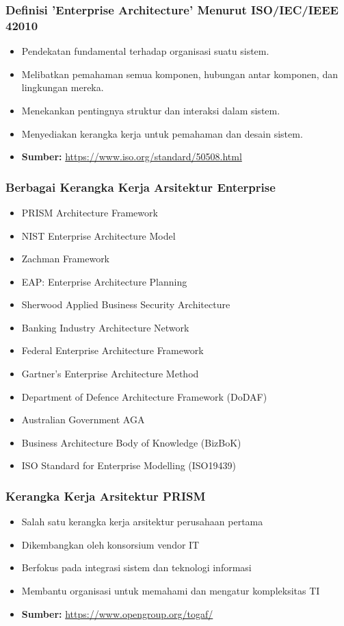 \documentclass{beamer}
\begin{document}
	\begin{frame}
		\frametitle{Definisi 'Enterprise Architecture' Menurut ISO/IEC/IEEE 42010}
		\begin{itemize}
			\item Pendekatan fundamental terhadap organisasi suatu sistem.
			\item Melibatkan pemahaman semua komponen, hubungan antar komponen, dan lingkungan mereka.
			\item Menekankan pentingnya struktur dan interaksi dalam sistem.
			\item Menyediakan kerangka kerja untuk pemahaman dan desain sistem.
			\item \textbf{Sumber:} \url{https://www.iso.org/standard/50508.html}
		\end{itemize}
	\end{frame}
	
	
	\begin{frame}
		\frametitle{Berbagai Kerangka Kerja Arsitektur Enterprise}
		\begin{itemize}
			\item PRISM Architecture Framework
			\item NIST Enterprise Architecture Model
			\item Zachman Framework
			\item EAP: Enterprise Architecture Planning
			\item Sherwood Applied Business Security Architecture
			\item Banking Industry Architecture Network
			\item Federal Enterprise Architecture Framework
			\item Gartner’s Enterprise Architecture Method
			\item Department of Defence Architecture Framework (DoDAF)
			\item Australian Government AGA
			\item Business Architecture Body of Knowledge (BizBoK)
			\item ISO Standard for Enterprise Modelling (ISO19439)
		\end{itemize}
	\end{frame}
	
	\begin{frame}
		\frametitle{Kerangka Kerja Arsitektur PRISM}
		\begin{itemize}
			\item Salah satu kerangka kerja arsitektur perusahaan pertama
			\item Dikembangkan oleh konsorsium vendor IT
			\item Berfokus pada integrasi sistem dan teknologi informasi
			\item Membantu organisasi untuk memahami dan mengatur kompleksitas TI
			\item \textbf{Sumber:} \url{https://www.opengroup.org/togaf/}
		\end{itemize}
	\end{frame}
	
\end{document}
